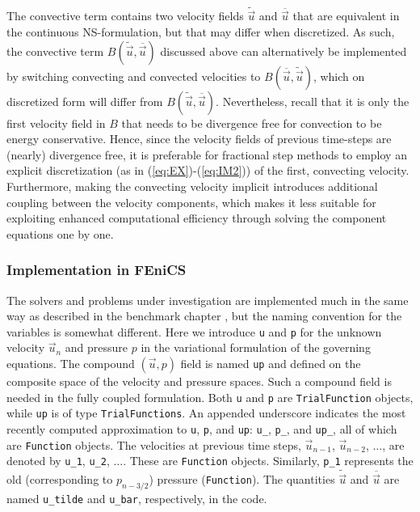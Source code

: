 The convective term contains two velocity fields $\tilde{\vec{u}}$ and
$\overline{\vec{u}}$ that are equivalent in the continuous NS-formulation, but that may differ when
discretized. As such, the convective term
$B(\tilde{\vec{u}},\overline{\vec{u}})$ discussed above can
alternatively be implemented by switching convecting and convected
velocities to $B(\overline{\vec{u}},\tilde{\vec{u}})$, which on
discretized form will differ from
$B(\tilde{\vec{u}},\overline{\vec{u}})$. Nevertheless, recall that it
is only the first velocity field in $B$ that needs to be divergence
free for convection to be energy conservative. Hence, since the
velocity fields of previous time-steps are (nearly) divergence free,
it is preferable for fractional step
methods to employ an explicit discretization (as in
(\ref{eq:EX})-(\ref{eq:IM2})) of the first, convecting
velocity. Furthermore, making the convecting velocity implicit
introduces additional coupling between the velocity components, which
makes it less suitable for exploiting enhanced computational efficiency
through solving the component equations one by one.

\subsubsection{Implementation in FEniCS}
\label{sec:impl_fenics}
The solvers and problems under investigation are implemented much in the
same way as described in the benchmark chapter \cite{nsbench}, but the naming
convention for the variables is somewhat different. Here we introduce
{\fontsize{12pt}{12pt}\texttt{u}} and {\fontsize{12pt}{12pt}\texttt{p}} for the unknown velocity $\vec{u}_n$ and pressure $p$
in the
variational formulation of the governing equations. 
The compound
$(\vec{u},p)$ field is named {\fontsize{12pt}{12pt}\texttt{up}} and
defined on the composite space of the velocity and
pressure spaces. Such a compound field is needed in the 
fully coupled formulation.
Both {\fontsize{12pt}{12pt}\texttt{u}} and {\fontsize{12pt}{12pt}\texttt{p}} are
{\fontsize{12pt}{12pt}\texttt{TrialFunction}} objects, while {\fontsize{12pt}{12pt}\texttt{up}} is of type {\fontsize{12pt}{12pt}\texttt{TrialFunctions}}.
An appended underscore indicates
the most recently computed
approximation to {\fontsize{12pt}{12pt}\texttt{u}}, {\fontsize{12pt}{12pt}\texttt{p}}, and {\fontsize{12pt}{12pt}\texttt{up}}:
{\fontsize{12pt}{12pt}\verb!u_!}, {\fontsize{12pt}{12pt}\verb!p_!}, and {\fontsize{12pt}{12pt}\verb!up_!}, all of which are {\fontsize{12pt}{12pt}\texttt{Function}} objects.
The velocities at previous time steps, $\vec{u}_{n-1}$, $\vec{u}_{n-2}$, $\ldots$, are denoted by {\fontsize{12pt}{12pt}\verb!u_1!}, {\fontsize{12pt}{12pt}\verb!u_2!}, $\ldots$. These are
{\fontsize{12pt}{12pt}\texttt{Function}} objects. Similarly, {\fontsize{12pt}{12pt}\verb!p_1!} represents the old (corresponding to $p_{n-3/2}$)  pressure 
({\fontsize{12pt}{12pt}\texttt{Function}}).
The quantities $\tilde{\vec{u}}$ and $\overline{\vec{u}}$ are
named {\fontsize{12pt}{12pt}\verb!u_tilde!} and {\fontsize{12pt}{12pt}\verb!u_bar!}, respectively, in the code.

